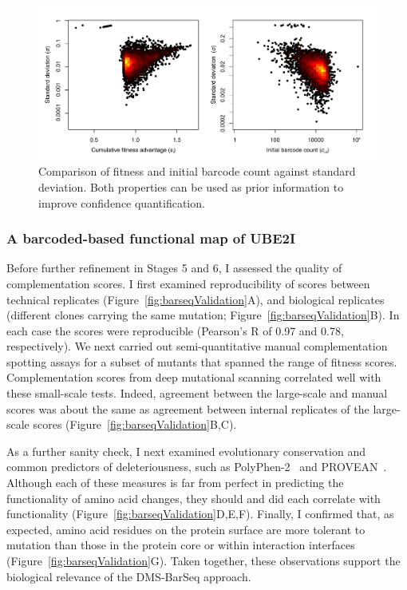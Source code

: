 \begin{figure}[h!]
	\centering
	\includegraphics[width=\textwidth]{img/baldi_long.pdf}
	\caption{Comparison of fitness and initial barcode count against standard deviation. Both properties can be used as prior information to improve confidence quantification.}
	\label{fig:baldiLong}
\end{figure}


\subsubsection{A barcoded-based functional map of UBE2I}

Before further refinement in Stages 5 and 6, I assessed the quality of complementation scores. I first examined reproducibility of scores between technical replicates (Figure~\ref{fig:barseqValidation}A), and biological replicates (different clones carrying the same mutation; Figure~\ref{fig:barseqValidation}B).  In each case the scores were reproducible (Pearson's R of 0.97 and 0.78, respectively). We next carried out semi-quantitative manual complementation spotting assays for a subset of mutants that spanned the range of fitness scores. Complementation scores from deep mutational scanning correlated well with these small-scale tests. Indeed, agreement between the large-scale and manual scores was about the same as agreement between internal replicates of the large-scale scores (Figure~\ref{fig:barseqValidation}B,C). 

As a further sanity check, I next examined evolutionary conservation and common predictors of deleteriousness, such as PolyPhen-2~\cite{adzhubei_predicting_2001} and PROVEAN~\cite{choi_predicting_2012}.  Although each of these measures is far from perfect in predicting the functionality of amino acid changes, they should and did each correlate with functionality (Figure~\ref{fig:barseqValidation}D,E,F). Finally, I confirmed that, as expected, amino acid residues on the protein surface are more tolerant to mutation than those in the protein core or within interaction interfaces (Figure~\ref{fig:barseqValidation}G).  Taken together, these observations support the biological relevance of the DMS-BarSeq approach.

